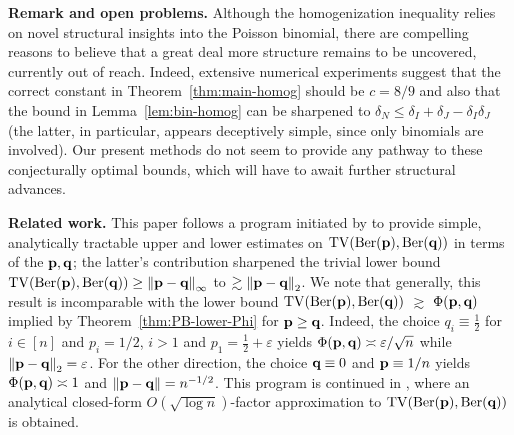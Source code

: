 \documentclass[11pt]{amsart}
\theoremstyle{plain}
\theoremstyle{definition}
\DeclareMathOperator{\TV}{TV}
\DeclareMathOperator{\Ber}{Ber}
\newcommand{\nrm}[1]{\left\Vert #1 \right\Vert}
\newcommand{\eps}{\varepsilon}
\renewcommand{\vec}[1]{\textup{{\bf #1}}}
\begin{document}
\medskip\noindent\textbf{Remark and open problems.}
Although the homogenization inequality
relies on novel structural insights into the Poisson binomial,
there are compelling reasons to believe that a great deal
more structure remains to be uncovered, currently out of reach.
Indeed, extensive numerical experiments suggest that
the correct constant in Theorem~\ref{thm:main-homog} should be
$c=8/9$
and also that the bound in Lemma~\ref{lem:bin-homog}
can be sharpened to $\delta_N\le \delta_I+\delta_J-\delta_I\delta_J$ (the latter, in particular, appears deceptively simple, since only binomials are involved).
Our present methods do not seem to provide
any pathway to these conjecturally optimal bounds, which will have to
await further structural advances.

\medskip\noindent\textbf{Related work.}
This paper follows a program initiated by \cite{kon25tens}
to provide simple, analytically tractable upper and lower
estimates on $\TV(\Ber(\vec{p}),\Ber(\vec{q}))$
in terms of the $\vec{p},\vec{q}$;
the latter's contribution sharpened the trivial
lower bound $\TV(\Ber(\vec{p}),\Ber(\vec{q}))\ge\nrm{\vec{p}-\vec{q}}_\infty$
to $
\gtrsim\nrm{\vec{p}-\vec{q}}_2$.
We note that
generally, this result is incomparable with
the lower bound
$
\TV(\Ber(\vec{p}),\Ber(\vec{q}))$
$\gtrsim$
$\Phi(\vec{p},\vec{q})
$
implied by Theorem~\ref{thm:PB-lower-Phi}
for $\vec p\ge\vec q$.
Indeed,
the choice $q_i\equiv\frac12$
for $i\in[n]$ and $p_i=1/2$, $i>1$ and $p_1=\frac12+\eps$
yields $\Phi(\vec{p},\vec{q})\asymp\eps/\sqrt{n}$ while $\nrm{\vec{p}-\vec{q}}_2=\eps$.
For the other direction, the choice $\vec{q}\equiv0$ and $\vec{p}\equiv1/n$
yields
$\Phi(\vec{p},\vec{q})\asymp1$ and $\nrm{\vec{p}-\vec{q}}=n^{-1/2}$.
This program is continued in \cite{KonAv26},
where
an analytical closed-form
$O(\sqrt{\log n})$-factor
approximation
to
$
\TV(\Ber(\vec{p}),\Ber(\vec{q}))
$
is obtained.
\end{document}
